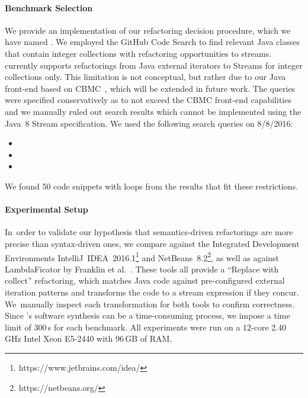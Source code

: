 \documentclass[runningheads,a4paper]{llncs}
\newcommand*{\extended}{}
\begin{document}
\paragraph{Benchmark Selection}
%
We provide an implementation of our refactoring decision procedure, which we
have named \tool. We employed the GitHub Code Search to find relevant Java
classes that contain integer collections with refactoring opportunities to
streams.  \tool currently supports refactorings from Java external
iterators to Streams for integer collections only.  This limitation
is not conceptual, but rather due to our Java front-end based on
CBMC~\cite{cbmc}, which will be extended in future work.
The queries were specified conservatively as to not exceed the
CBMC front-end capabilities and we manually ruled out search results which
cannot be implemented using the Java~8 Stream specification.
%
We used the following search queries on 8/8/2016:
\begin{itemize}
  \item {}
  \item {}
  \item {}
\end{itemize}
We found 50 code snippets with
loops from the results that fit these restrictions.

\paragraph{Experimental Setup}
%
In~order to validate our
hypothesis that semantics-driven refactorings are more precise than
syntax-driven ones, we compare \tool against the Integrated Development
Environments IntelliJ~IDEA~2016.1\footnote{https://www.jetbrains.com/idea/}
and NetBeans~8.2\footnote{https://netbeans.org/}, as well as against
LambdaFicator by Franklin et al.~\cite{DBLP:conf/icse/FranklinGLD04}.
These tools all provide a ``Replace with collect'' refactoring, which
matches Java code against pre-configured external iteration patterns and
transforms the code to a stream expression if they concur.  We~manually inspect
each transformation for both tools to confirm correctness.  
Since \tool's
software synthesis can be a time-consuming process, we impose a time limit
of 300\,s for each benchmark.  
All experiments were run on a 12-core
2.40\,GHz Intel Xeon E5-2440 with 96\,GB of RAM.
\end{document}
